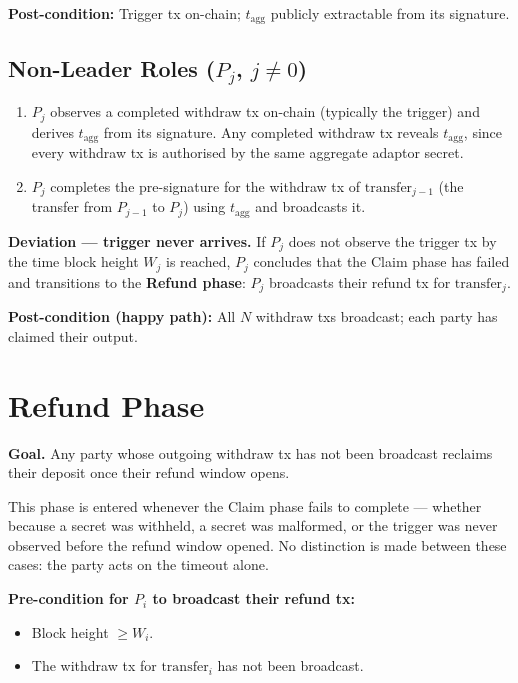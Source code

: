 \documentclass[11pt,a4paper,dvipsnames]{article}
\newcommand{\tagg}{t_{\mathrm{agg}}}
\begin{document}
\noindent\textbf{Post-condition:}
Trigger tx on-chain; $\tagg$ publicly extractable from its signature.

\subsection{Non-Leader Roles ($P_j$, $j \neq 0$)}

\begin{enumerate}
  \item $P_j$ observes a completed withdraw tx on-chain (typically the
    trigger) and derives $\tagg$ from its signature.
    Any completed withdraw tx reveals $\tagg$, since every withdraw tx is
    authorised by the same aggregate adaptor secret.
  \item $P_j$ completes the pre-signature for the withdraw tx of
    $\mathrm{transfer}_{j-1}$ (the transfer from $P_{j-1}$ to $P_j$) using
    $\tagg$ and broadcasts it.
\end{enumerate}

\noindent\textbf{Deviation --- trigger never arrives.}\;
If $P_j$ does not observe the trigger tx by the time block height $W_j$ is
reached, $P_j$ concludes that the Claim phase has failed and transitions to
the \textbf{Refund phase}: $P_j$ broadcasts their refund tx for
$\mathrm{transfer}_j$.

\noindent\textbf{Post-condition (happy path):}
All $N$ withdraw txs broadcast; each party has claimed their output.

\section{Refund Phase}

\textbf{Goal.}\;
Any party whose outgoing withdraw tx has not been broadcast reclaims their
deposit once their refund window opens.

This phase is entered whenever the Claim phase fails to complete --- whether
because a secret was withheld, a secret was malformed, or the trigger was
never observed before the refund window opened.
No distinction is made between these cases: the party acts on the timeout
alone.

\noindent\textbf{Pre-condition for $P_i$ to broadcast their refund tx:}
\begin{itemize}
  \item Block height $\geq W_i$.
  \item The withdraw tx for $\mathrm{transfer}_i$ has not been broadcast.
\end{itemize}
\end{document}
